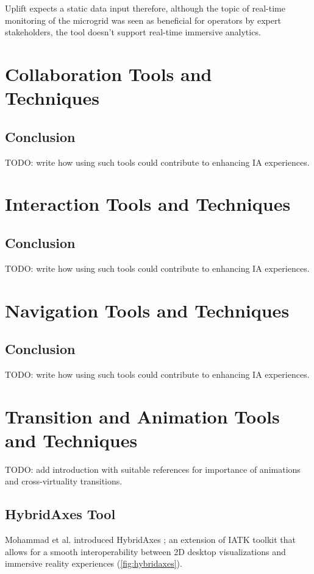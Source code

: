\documentclass{vgtc}                          %
\begin{document}
\medskip

\noindent Uplift expects a static data input therefore, although the topic of
real-time monitoring of the microgrid was seen as beneficial for operators by
expert stakeholders, the tool doesn't support real-time immersive analytics.

\section{Collaboration Tools and Techniques}
\subsection{Conclusion}
TODO: write how using such tools could contribute to enhancing IA experiences.
\section{Interaction Tools and Techniques}
\subsection{Conclusion}
TODO: write how using such tools could contribute to enhancing IA experiences.
\section{Navigation Tools and Techniques}
\subsection{Conclusion}
TODO: write how using such tools could contribute to enhancing IA experiences.
\section{Transition and Animation Tools and Techniques}
TODO: add introduction with suitable references for importance of animations
and cross-virtuality transitions.
\subsection{HybridAxes Tool}
Mohammad et al. introduced HybridAxes \cite{hybridaxes_tool}; an extension of
IATK toolkit that allows for a smooth interoperability between 2D desktop
visualizations and immersive reality experiences (\cref{fig:hybridaxes}).

\medskip
\end{document}
